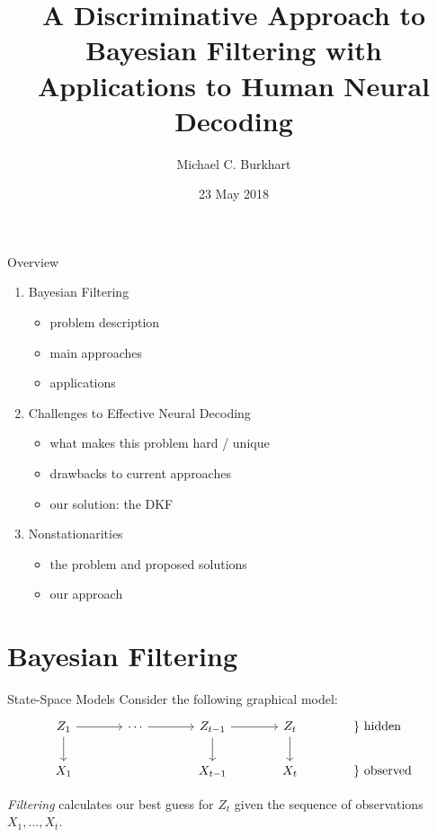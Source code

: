 \documentclass[aspectratio=169,19pt,xetex,handout]{beamer}
\title[Discriminative Filtering]{\Huge\textbf{A Discriminative Approach to Bayesian Filtering with Applications to Human Neural Decoding}}
\author[M. C. Burkhart]{\Large Michael C. Burkhart}
\institute{Division of Applied Mathematics\\ Brown University\\ Providence, Rhode Island}
\date{23 May 2018}
\begin{document}
\frame{\titlepage}


\begin{frame}{Overview}
\LARGE
\begin{enumerate}
    \item Bayesian Filtering
    \begin{itemize}
        \item problem description
        \item main approaches
        \item applications
    \end{itemize}
    \medskip
    \item Challenges to Effective Neural Decoding
    \begin{itemize}
        \item what makes this problem hard / unique
        \item drawbacks to current approaches
        \item our solution: the DKF
    \end{itemize}
    \medskip
    \item Nonstationarities
    \begin{itemize}
        \item the problem and proposed solutions
        \item our approach
    \end{itemize}
\end{enumerate}
\end{frame}


\section{Bayesian Filtering}
\begin{frame}{State-Space Models}
\Large
Consider the following graphical model:
\[
\begin{tikzcd}[ampersand replacement=\&,column sep=large, /tikz/column 5/.append style={anchor=base west}]
Z_1 \arrow[r] \arrow[d]
	\& \cdots \arrow[r]
		\& Z_{t-1} \arrow[r]  \arrow[d]
			\& Z_t \arrow[d] 
			\&{\}\text{ hidden}}\\
	X_1
	\& 
		\& X_{t-1} 
			\& X_t
			    \&{\}\text{ observed}}
\end{tikzcd}
\]

\bigskip

\emph{Filtering} calculates our best guess for $Z_t$ given the sequence of observations $X_1,\dotsc,X_t$.


\end{frame}
\end{document}
